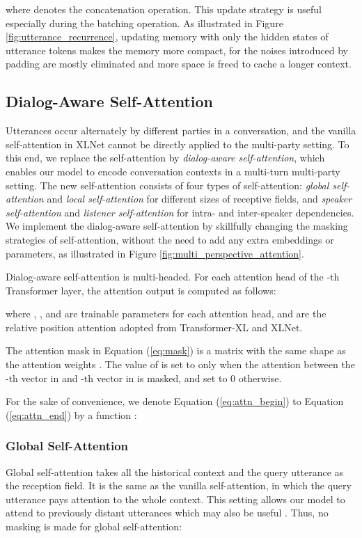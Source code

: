 \documentclass[letterpaper]{article} \usepackage{aaai21}  \usepackage{times}  \usepackage{helvet} \usepackage{courier}  \usepackage[hyphens]{url}  \usepackage{graphicx} \usepackage{amstext}
\begin{document}
where  denotes the concatenation operation. This update strategy is useful especially during the batching operation. As illustrated in Figure \ref{fig:utterance_recurrence}, updating memory with only the hidden states of utterance tokens makes the memory more compact, for the noises introduced by padding are mostly eliminated and more space is freed to cache a longer context.

\subsection{Dialog-Aware Self-Attention}
Utterances occur alternately by different parties in a conversation, and the vanilla self-attention in XLNet cannot be directly applied to the  multi-party setting. To this end, we replace the self-attention by \emph{dialog-aware self-attention}, which enables our model to encode conversation contexts in a multi-turn multi-party setting. The new self-attention consists of four types of self-attention: \emph{global self-attention} and \emph{local self-attention} for different sizes of receptive fields, and \emph{speaker self-attention} and \emph{listener self-attention} for intra- and inter-speaker dependencies. We implement the dialog-aware self-attention by skillfully changing the masking strategies of self-attention, without the need to add any extra embeddings or parameters, as illustrated in Figure \ref{fig:multi_perspective_attention}.

Dialog-aware self-attention is multi-headed. For each attention head of the -th Transformer layer, the attention output  is computed as follows:
 




where , , and  are trainable parameters for each attention head, and  are the relative position attention adopted from Transformer-XL and XLNet. 

The attention mask  in Equation (\ref{eq:mask}) is a matrix with the same shape as the attention weights . The value of  is set to  only when the attention between the -th vector in  and -th vector in  is masked, and set to 0 otherwise.

For the sake of convenience, we denote Equation (\ref{eq:attn_begin}) to Equation (\ref{eq:attn_end}) by a function :


\subsubsection{Global Self-Attention}
Global self-attention takes all the historical context and the query utterance as the reception field. It is the same as the vanilla self-attention, in which the query utterance pays attention to the whole context. This setting allows our model to attend to previously distant utterances which may also be useful \cite{majumder2019dialoguernn}. Thus, no masking is made for global self-attention:
\end{document}
